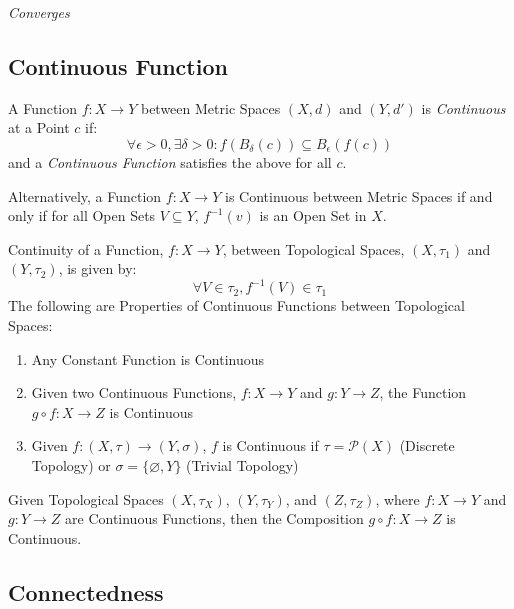\emph{Converges}



\subsection{Continuous Function}\label{sec:continuous_function}

A Function $f : X \rightarrow Y$ between Metric Spaces $(X,d)$ and
$(Y,d')$ is \emph{Continuous} at a Point $c$ if:
\[
    \forall \epsilon > 0, \exists \delta > 0 :
    f (B_{\delta}(c)) \subseteq B_{\epsilon}(f(c))
\]
and a \emph{Continuous Function} satisfies the above for all $c$.

Alternatively, a Function $f: X \rightarrow Y$ is Continuous between
Metric Spaces if and only if for all Open Sets $V \subseteq Y$,
$f^{-1}(v)$ is an Open Set in $X$.

Continuity of a Function, $f : X \rightarrow Y$, between Topological
Spaces, $(X,\tau_1)$ and $(Y,\tau_2)$, is given by:
\[
    \forall V \in \tau_2, f^{-1}(V) \in \tau_1
\]
The following are Properties of Continuous Functions between
Topological Spaces:
\begin{enumerate}
    \item Any Constant Function is Continuous
    \item Given two Continuous Functions, $f : X \rightarrow Y$ and $g
      : Y \rightarrow Z$, the Function $g \circ f : X \rightarrow Z$ is
      Continuous
    \item Given $f : (X, \tau) \rightarrow (Y, \sigma)$, $f$ is
      Continuous if $\tau = \mathcal{P}(X)$ (Discrete Topology) or
      $\sigma = \{\varnothing, Y\}$ (Trivial Topology)
\end{enumerate}
Given Topological Spaces $(X, \tau_X)$, $(Y, \tau_Y)$, and $(Z,
\tau_Z)$, where $f: X \rightarrow Y$ and $g: Y \rightarrow Z$ are
Continuous Functions, then the Composition $g \circ f : X \rightarrow
Z$ is Continuous.



\subsection{Connectedness}\label{sec:connectedness}

